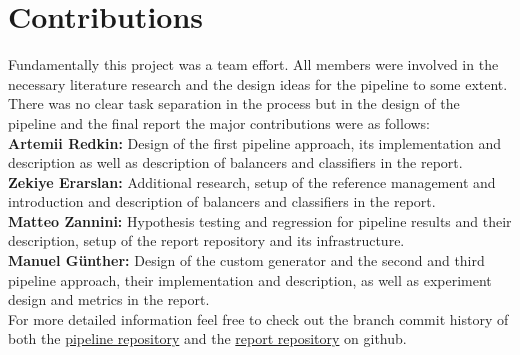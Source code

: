 \section{Contributions}

Fundamentally this project was a team effort. All members were involved in the necessary literature research and the design ideas for the pipeline to some extent.
There was no clear task separation in the process but in the design of the pipeline and the final report the major contributions were as follows:\\

\textbf{Artemii Redkin:} Design of the first pipeline approach, its implementation and description as well as description of balancers and classifiers in the report.\\

\textbf{Zekiye Erarslan:} Additional research, setup of the reference management and introduction and description of balancers and classifiers in the report.\\

\textbf{Matteo Zannini:} Hypothesis testing and regression for pipeline results and their description, setup of the report repository and its infrastructure.\\

\textbf{Manuel Günther:} Design of the custom generator and the second and third pipeline approach, their implementation and description, 
as well as experiment design and metrics in the report.\\

For more detailed information feel free to check out the branch commit history of both the \href{https://github.com/gnthr-solve/TP_ML_Pipeline}{pipeline repository}
and the \href{https://github.com/gnthr-solve/TP_ML_PL_report}{report repository} on github.
